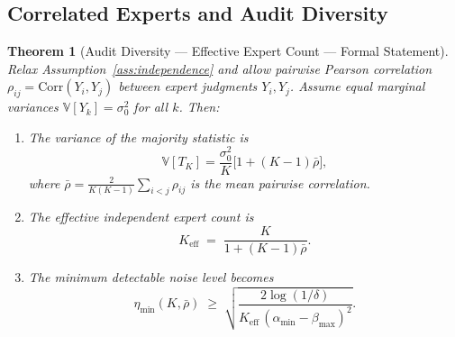 \documentclass[12pt,a4paper]{article}
\newtheorem{theorem}{Theorem}[section]
\newcommand{\V}{\mathbb{V}}
\newcommand{\etamin}{\eta_{\min}}
\newcommand{\rhobar}{\bar{\rho}}
\begin{document}
\subsection{Correlated Experts and Audit Diversity}
\label{sec:diversity}

\begin{theorem}[Audit Diversity --- Effective Expert Count --- Formal Statement]
\label{thm:diversity}
Relax Assumption~\ref{ass:independence} and allow pairwise Pearson correlation
$\rho_{ij} = \mathrm{Corr}(Y_i,Y_j)$ between expert judgments $Y_i,Y_j$.
Assume equal marginal variances $\V[Y_k]=\sigma_0^{2}$ for all $k$.  Then:
\begin{enumerate}[label=(\roman*)]
    \item The variance of the majority statistic is
    \begin{equation}\label{eq:var-corr}
        \V[T_K] = \frac{\sigma_0^{2}}{K}\bigl[1 + (K-1)\rhobar\bigr],
    \end{equation}
    where $\rhobar = \frac{2}{K(K-1)}\sum_{i<j}\rho_{ij}$ is the mean pairwise
    correlation.
    \item The effective independent expert count is
    \begin{equation}\label{eq:K-eff}
        K_{\mathrm{eff}} \;=\; \frac{K}{1 + (K-1)\rhobar}.
    \end{equation}
    \item The minimum detectable noise level becomes
    \begin{equation}\label{eq:eta-min-corr}
        \etamin(K,\rhobar) \;\geq\;
        \sqrt{\frac{2\log(1/\delta)}
                   {K_{\mathrm{eff}}\,(\alpha_{\min}-\beta_{\max})^{2}}}.
    \end{equation}
\end{enumerate}
\end{theorem}
\end{document}
